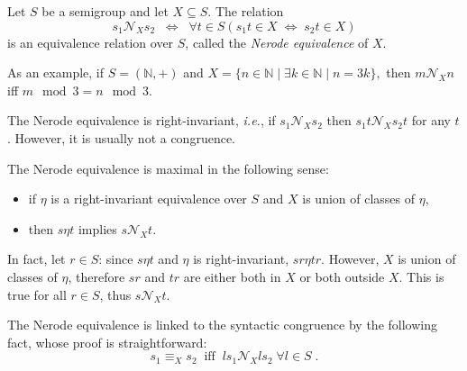 \documentclass[12pt]{article}
\begin{document}
Let $S$ be a semigroup and let $X\subseteq S$.
The relation
\begin{equation} \label{eq:ne}
s_1\mathcal{N}_X s_2
\;\;\iff\;\;
\forall t\in S (s_1t\in X\;\iff\;s_2t\in X)
\end{equation}
is an equivalence relation over $S$,
called the \emph{Nerode equivalence} of $X$.

As an example,
if $S=(\mathbb{N},+)$ and
\begin{math}
X=\{n\in\mathbb{N}\mid\exists k\in\mathbb{N}\mid n=3k\},
\end{math}
then $m\mathcal{N}_X n$ iff $m\mod 3=n\mod 3$.

The Nerode equivalence is right-invariant,
\emph{i.e.}, if $s_1\mathcal{N}_Xs_2$
then $s_1t\mathcal{N}_Xs_2t$ for any $t$.
However, it is usually not a congruence.

The Nerode equivalence is maximal in the following sense:
\begin{itemize}
\item if $\eta$ is a right-invariant equivalence over $S$ %
and $X$ is union of classes of $\eta$,
\item then $s\eta t$ implies $s\mathcal{N}_X t$.
\end{itemize}
In fact, let $r\in S$:
since $s\eta t$ and $\eta$ is right-invariant, $sr\eta tr$.
However, $X$ is union of classes of $\eta$,
therefore $sr$ and $tr$
are either both in $X$ or both outside $X$.
This is true for all $r\in S$, thus $s\mathcal{N}_X t$.

The Nerode equivalence is linked to the syntactic congruence 
by the following fact, whose proof is straightforward:
\begin{displaymath}
s_1\equiv_X s_2
\;\;\mathrm{iff}\;\;
ls_1\mathcal{N}_X ls_2\;\forall l\in S\;.
\end{displaymath}

\end{document}

